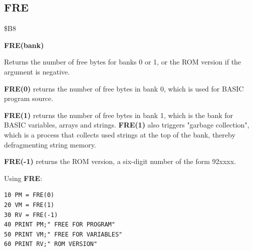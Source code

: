 \subsection{FRE}
\begin{description}[leftmargin=2cm,style=nextline]
\item [Token:] \$B8
\item [Format:] {\bf FRE(bank)}
\item [Usage:] Returns the number of free bytes for banks 0 or 1,
               or the ROM version if the argument is negative.

               {\bf FRE(0)} returns the number of free bytes in
               bank 0, which is used for BASIC program source.

               {\bf FRE(1)} returns the number of free bytes in
               bank 1, which is the bank for BASIC variables, arrays
               and strings. {\bf FRE(1)} also triggers
               "garbage collection", which is a process that collects
               used strings at the top of the bank, thereby
               defragmenting string memory.

               {\bf FRE(-1)} returns the ROM version, a six-digit number
               of the form 92xxxx.

\item [Example:] Using {\bf FRE}:
\begin{tcolorbox}[colback=black,coltext=white]
\verbatimfont{\codefont}
\begin{verbatim}
10 PM = FRE(0)
20 VM = FRE(1)
30 RV = FRE(-1)
40 PRINT PM;" FREE FOR PROGRAM"
50 PRINT VM;" FREE FOR VARIABLES"
60 PRINT RV;" ROM VERSION"
\end{verbatim}
\end{tcolorbox}
\end{description}


\newpage
